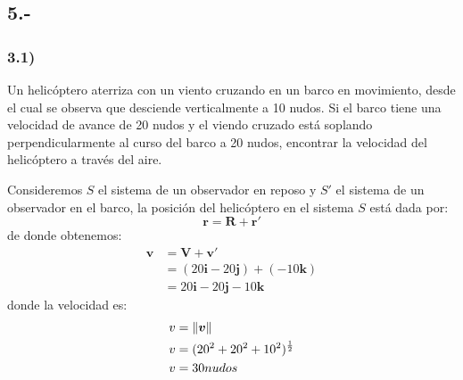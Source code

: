 \documentclass{article}
\DeclarePairedDelimiter{\norm}{\lVert}{\rVert}
\begin{document}
\subsection*{5.-}
\subsubsection*{3.1)}
Un helicóptero aterriza con un viento cruzando en un barco en movimiento, desde el cual se observa que desciende verticalmente a 10 nudos. Si el barco tiene una velocidad de avance de 20 nudos y el viendo cruzado está soplando perpendicularmente al curso del barco a 20 nudos, encontrar la velocidad del helicóptero a través del aire.
\begin{tcolorbox}
Consideremos $S$ el sistema de un observador en reposo y $S'$ el sistema de un observador en el barco, la posición del helicóptero en el sistema $S$ está dada por:
\[ \bm{r} = \bm{R} + \bm{r'} \]
de donde obtenemos:
\begin{align*}
    \bm{v} 
    &= \bm{V} + \bm{v'} \\
    &= (20\bm{i} - 20\bm{j}) +(-10\bm{k}) \\
    &= 20\bm{i} - 20\bm{j} - 10\bm{k}
\end{align*}
donde la velocidad es:
\begin{align*}
    v &= \norm{\bm{v}} \\
    v &= (20^2 + 20^2 + 10^2)^\frac{1}{2} \\
    v &= 30 nudos    
\end{align*}
\end{tcolorbox}
\end{document}
